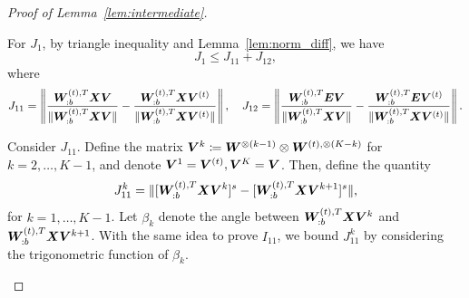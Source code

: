 \documentclass[lettersize,journal]{IEEEtran}
\theoremstyle{definition}
\theoremstyle{definition}
\def\fixme#1#2{\textbf{\color{red}[FIXME (#1): #2]}}
\begin{document}
\begin{proof}[Proof of Lemma~\ref{lem:intermediate}]
\begin{enumerate}
    For $J_1$, by triangle inequality and Lemma~\ref{lem:norm_diff}, we have 
    \begin{equation}
        J_1 \leq J_{11} + J_{12},
    \end{equation}
    where 
    \begin{equation}
        J_{11} =  \left\lVert \frac{\bm{W}_{:b}^{(t),T} \bm X \bm{V} }{\lVert \bm{W}_{:b}^{(t),T} \bm X \bm{V} \rVert} - \frac{\bm{W}_{:b}^{(t),T} \bm X \bm{V}^{(t)} }{\lVert \bm{W}_{:b}^{(t),T} \bm X \bm{V}^{(t)} \rVert}  \right\rVert, \quad J_{12} =  \left\lVert \frac{\bm{W}_{:b}^{(t),T}  \bm{E} \bm{V}}{ \lVert\bm{W}_{:b}^{(t),T}  \bm X \bm{V}\rVert } - \frac{\bm{W}_{:b}^{(t),T}  \bm{E} \bm{V}^{(t)}}{ \lVert\bm{W}_{:b}^{(t),T}  \bm X \bm{V}^{(t)}\rVert }   \right\rVert.
    \end{equation}
    
    
    Consider $J_{11}$.  Define the matrix $\bm{V}^{k} \coloneqq \bm{W}^{\otimes (k-1)} \otimes \bm{W}^{(t), \otimes (K-k)}$ for $k = 2,\ldots, K-1$, and denote $\bm{V}^1 = \bm{V}^{(t)}, \bm{V}^K = \bm{V}$. Then, define the quantity
    \begin{equation}
        J_{11}^k = \lVert [\bm{W}_{:b}^{(t),T} \bm X \bm{V}^k ]^s - [\bm{W}_{:b}^{(t),T} \bm X \bm{V}^{k+1} ]^s \rVert,
     \end{equation}
    for $k = 1,\ldots, K-1$. Let $\beta_k$ denote the angle between $\bm{W}_{:b}^{(t),T} \bm X \bm{V}^k$ and $\bm{W}_{:b}^{(t),T} \bm X \bm{V}^{k+1}$. With the same idea to prove $I_{11}$, we bound $J_{11}^k$ by considering the trigonometric function of $\beta_k$. 
    

\end{enumerate}
\end{proof}
\end{document}
